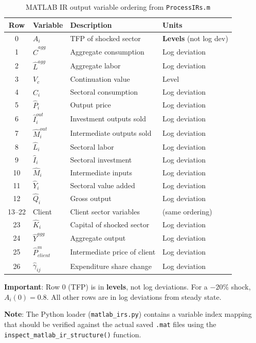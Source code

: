 \documentclass[11pt]{article}
\begin{document}
\begin{table}[h]
\centering
\begin{tabular}{clll}
\toprule
\textbf{Row} & \textbf{Variable} & \textbf{Description} & \textbf{Units} \\
\midrule
0 & $A_i$ & TFP of shocked sector & \textbf{Levels} (not log dev) \\
1 & $\hat{C}^{agg}$ & Aggregate consumption & Log deviation \\
2 & $\hat{L}^{agg}$ & Aggregate labor & Log deviation \\
3 & $V_c$ & Continuation value & Level \\
4 & $\hat{C}_i$ & Sectoral consumption & Log deviation \\
5 & $\hat{P}_i$ & Output price & Log deviation \\
6 & $\hat{I}^{out}_i$ & Investment outputs sold & Log deviation \\
7 & $\hat{M}^{out}_i$ & Intermediate outputs sold & Log deviation \\
8 & $\hat{L}_i$ & Sectoral labor & Log deviation \\
9 & $\hat{I}_i$ & Sectoral investment & Log deviation \\
10 & $\hat{M}_i$ & Intermediate inputs & Log deviation \\
11 & $\hat{Y}_i$ & Sectoral value added & Log deviation \\
12 & $\hat{Q}_i$ & Gross output & Log deviation \\
13--22 & Client & Client sector variables & (same ordering) \\
23 & $\hat{K}_i$ & Capital of shocked sector & Log deviation \\
24 & $\hat{Y}^{agg}$ & Aggregate output & Log deviation \\
25 & $\hat{P}^m_{client}$ & Intermediate price of client & Log deviation \\
26 & $\hat{\gamma}_{ij}$ & Expenditure share change & Log deviation \\
\bottomrule
\end{tabular}
\caption{MATLAB IR output variable ordering from \texttt{ProcessIRs.m}}
\end{table}

\textbf{Important}: Row 0 (TFP) is in \textbf{levels}, not log deviations. For a $-20\%$ shock, $A_i(0) = 0.8$. All other rows are in log deviations from steady state.

\textbf{Note}: The Python loader (\texttt{matlab\_irs.py}) contains a variable index mapping that should be verified against the actual saved \texttt{.mat} files using the \texttt{inspect\_matlab\_ir\_structure()} function.
\end{document}
